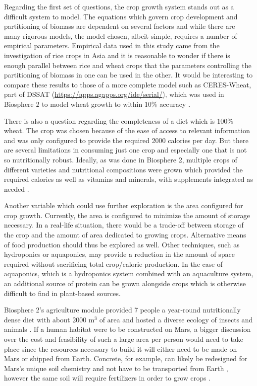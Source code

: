Regarding the first set of questions, the crop growth system stands out as a difficult system to model. The equations which govern crop development and partitioning of biomass are dependent on several factors and while there are many rigorous models, the model chosen, albeit simple, requires a number of empirical parameters. Empirical data used in this study came from the investigation of rice crops in Asia \cite{RICEPEST} and it is reasonable to wonder if there is enough parallel between rice and wheat crops that the parameters controlling the partitioning of biomass in one can be used in the other. It would be interesting to compare these results to those of a more complete model such as CERES-Wheat, part of DSSAT (\url{https://apps.agapps.org/ide/serial/}), which was used in Biosphere 2 to model wheat growth to within 10\% accuracy \cite{biosphere_wheat}. 

There is also a question regarding the completeness of a diet which is 100\% wheat. The crop was chosen because of the ease of access to relevant information and was only configured to provide the required 2000 calories per day. But there are several limitations in consuming just one crop and especially one that is not so nutritionally robust. Ideally, as was done in Biosphere 2, multiple crops of different varieties and nutritional compositions were grown which provided the required calories as well as vitamins and minerals, with supplements integrated as needed \cite{biosphere_diet}.

Another variable which could use further exploration is the area configured for crop growth. Currently, the area is configured to minimize the amount of storage necessary. In a real-life situation, there would be a trade-off between storage of the crop and the amount of area dedicated to growing crops. Alternative means of food production should thus be explored as well. Other techniques, such as hydroponics or aquaponics, may provide a reduction in the amount of space required without sacrificing total crop/calorie production. In the case of aquaponics, which is a hydroponics system combined with an aquaculture system, an additional source of protein can be grown alongside crops which is otherwise difficult to find in plant-based sources.

Biosphere 2's agriculture module provided 7 people a year-round nutritionally dense diet with about 2000 m$^3$ of area and hosted a diverse ecology of insects and animals \cite{biosphere_agriculture}. If a human habitat were to be constructed on Mars, a bigger discussion over the cost and feasibility of such a large area per person would need to take place since the resources necessary to build it will either need to be made on Mars or shipped from Earth. Concrete, for example, can likely be redesigned for Mars's unique soil chemistry and not have to be transported from Earth \cite{mars_concrete}, however the same soil will require fertilizers in order to grow crops \cite{mars_soil_crops}.

